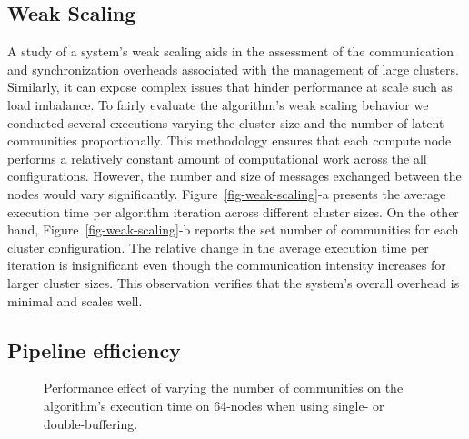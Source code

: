 \subsection{Weak Scaling}

\begin{figure*}[t] %
  \centering
  \caption{(a) Average execution time per algorithm iteration varying
  the number of latent communities proportionally to the number of compute
  nodes. (b) The exact number of communities used for each data point in (a).}
  \label{fig-weak-scaling}
\end{figure*}

A study of a system's weak scaling aids in the assessment of the communication
and synchronization overheads associated with the management of large clusters.
Similarly, it can expose complex issues that hinder performance at scale such
as load imbalance. To fairly evaluate the algorithm's weak scaling behavior we
conducted several executions varying the cluster size and the number of latent
communities proportionally. This methodology ensures that each compute node
performs a relatively constant amount of computational work across the all
configurations. However, the number and size of messages exchanged between the
nodes would vary significantly. Figure~\ref{fig-weak-scaling}-a presents the
average execution
time per algorithm iteration across different cluster sizes. On the other hand,
Figure~\ref{fig-weak-scaling}-b reports the set number of communities for each
cluster configuration. The relative change in the average execution time per
iteration is insignificant even though the communication intensity increases
for larger cluster sizes. This observation verifies that the system's overall
overhead is minimal and scales well.

\subsection{Pipeline efficiency}

\begin{figure}[t] %
  \centering
  \caption{Performance effect of varying the number of communities on the
    algorithm's execution time on 64-nodes when using single- or
    double-buffering.}
  \label{fig-pipeline}
\end{figure}

